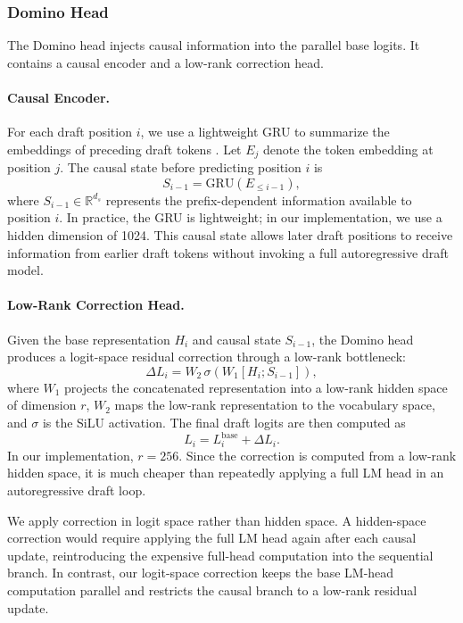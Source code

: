 \documentclass{llmxive}
\begin{document}
\subsubsection{Domino Head}

The Domino head injects causal information into the parallel base logits. It contains a causal encoder and a low-rank correction head.

\paragraph{Causal Encoder.}
For each draft position \(i\), we use a lightweight GRU to summarize the embeddings of preceding draft tokens \citep{cho2014learning}. Let \(E_j\) denote the token embedding at position \(j\). The causal state before predicting position \(i\) is
\[
S_{i-1} = \mathrm{GRU}(E_{\le i-1}),
\]
where \(S_{i-1} \in \mathbb{R}^{d_s}\) represents the prefix-dependent information available to position \(i\). In practice, the GRU is lightweight; in our implementation, we use a hidden dimension of 1024. This causal state allows later draft positions to receive information from earlier draft tokens without invoking a full autoregressive draft model.

\paragraph{Low-Rank Correction Head.}
Given the base representation \(H_i\) and causal state \(S_{i-1}\), the Domino head produces a logit-space residual correction through a low-rank bottleneck:
\[
\Delta L_i
=
W_2 \, \sigma\!\left(W_1 [H_i; S_{i-1}]\right),
\]
where \(W_1\) projects the concatenated representation into a low-rank hidden space of dimension \(r\), \(W_2\) maps the low-rank representation to the vocabulary space, and \(\sigma\) is the SiLU activation. The final draft logits are then computed as
\[
L_i = L_i^{\mathrm{base}} + \Delta L_i.
\]
In our implementation, \(r=256\). Since the correction is computed from a low-rank hidden space, it is much cheaper than repeatedly applying a full LM head in an autoregressive draft loop.

We apply correction in logit space rather than hidden space. A hidden-space correction would require applying the full LM head again after each causal update, reintroducing the expensive full-head computation into the sequential branch. In contrast, our logit-space correction keeps the base LM-head computation parallel and restricts the causal branch to a low-rank residual update.
\end{document}
